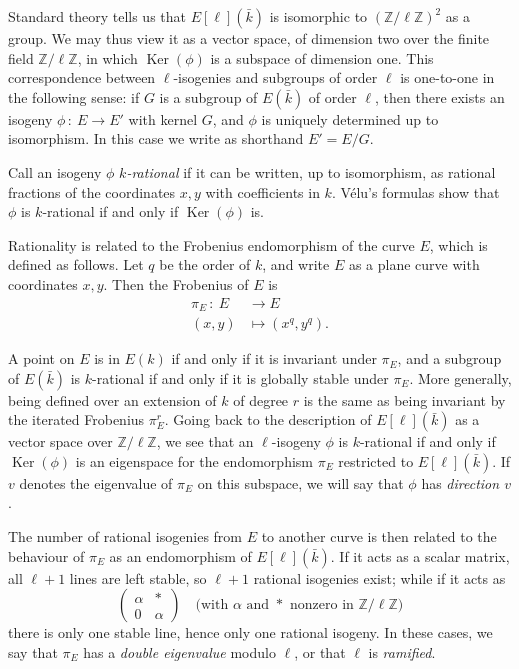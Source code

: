 \documentclass{article}
\newcommand{\Z}{\mathbb{Z}}
\newcommand{\from}{\ensuremath{\,:\ }}
\theoremstyle{definition}
\DeclareMathOperator{\Ker}{Ker}
\begin{document}
Standard theory tells us that $E[\ell](\bar{k})$ is isomorphic to $(\Z/\ell\Z)^2$
as a group. We may thus view it as a vector space, of dimension two over the 
finite field $\Z/\ell\Z$, in which $\Ker(\phi)$ is a subspace of dimension one. 
This correspondence between $\ell$-isogenies and subgroups of order $\ell$ is 
one-to-one in the following sense: if $G$ is a subgroup of $E(\bar{k})$ of order $\ell$, then there 
exists an isogeny $\phi\from E\to E'$ with kernel $G$, and $\phi$ is uniquely 
determined up to isomorphism. In this case we write as shorthand $E' = E/G$.

Call an isogeny $\phi$ \emph{$k$-rational} if it can be written, up to
isomorphism, as rational fractions of the coordinates $x, y$
with coefficients in $k$. Vélu's formulas \cite{}
show that $\phi$ is $k$-rational if and only if $\Ker(\phi)$ is.

Rationality is related to the Frobenius endomorphism of the curve $E$, which is 
defined as follows. Let $q$ be the order of $k$, and write $E$ as a plane curve 
with coordinates $x, y$. Then the Frobenius of $E$ is
\[
\begin{aligned}
\pi_E \from E &\to E \\
 (x, y) &\mapsto (x^q, y^q).
\end{aligned}
\]

A point on $E$ is in $E(k)$ if and only if it is invariant under $\pi_E$, 
and a subgroup of $E(\bar{k})$ is $k$-rational if and only if it is globally 
stable under $\pi_E$. More generally, being defined over an extension of $k$
of degree $r$ is the same as being invariant by the iterated Frobenius $\pi_E^r$.
Going back to the description of $E[\ell](\bar{k})$ as a 
vector space over $\Z/\ell\Z$, we see that an $\ell$-isogeny $\phi$ is 
$k$-rational if and only if $\Ker(\phi)$ is an eigenspace for the 
endomorphism $\pi_E$ restricted to $E[\ell](\bar{k})$. If $v$ denotes the 
eigenvalue of $\pi_E$ on this subspace, we will say that $\phi$ has \emph{
direction $v$}.


The number of rational isogenies from $E$ to another curve is then related to 
the behaviour of $\pi_E$ as an endomorphism of $E[\ell](\bar{k})$. If it acts 
as a scalar matrix, all $\ell+1$ lines are left stable, so $\ell+1$ rational 
isogenies exist; while if it acts as
\[
\left(
\begin{matrix}
\alpha & * \\
0 & \alpha
\end{matrix}
\right)
\quad
\text{(with $\alpha$ and $*$ nonzero in $\Z/\ell\Z$)}
\]
there is only one stable line, hence only one rational isogeny. In these cases, 
we say that $\pi_E$ has a \emph{double eigenvalue} modulo $\ell$, or that $\ell$
 is \emph{ramified}.
\end{document}
